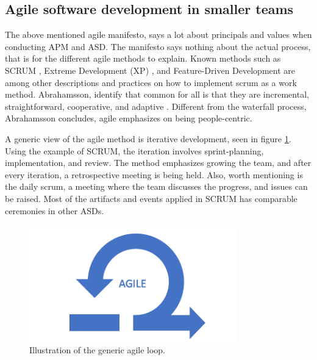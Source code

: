 \subsection{Agile software development in smaller teams}
The above mentioned agile manifesto, says a lot about principals and values when conducting APM and ASD. The manifesto says nothing about the actual process, that is for the different agile methods to explain. Known methods such as SCRUM \cite{sutherland}, Extreme Development (XP) \cite{Beck:1999:EPE:318762}, and Feature-Driven Development\cite{palmer2001practical} are among other descriptions and practices on how to implement scrum as a work method. Abrahamsson, identify that common for all is that they are incremental, straightforward, cooperative, and adaptive \cite{abrahamsson2017agile}. Different from the waterfall process, Abrahamsson concludes, agile emphasizes on being people-centric. 

A generic view of the agile method is iterative development, seen in figure \ref{fig:agile_iteration}. Using the example of SCRUM, the iteration involves sprint-planning, implementation, and review. The method emphasizes growing the team, and after every iteration, a retrospective meeting is being held. Also, worth mentioning is the daily scrum, a meeting where the team discusses the progress, and issues can be raised. Most of the artifacts and events applied in SCRUM has comparable ceremonies in other ASDs. 

\begin{figure}
    \centering
    \includegraphics[width=0.8\textwidth]{fig/agile_loop.png}
    \caption{Illustration of the generic agile loop.}
    \label{fig:agile_iteration}
\end{figure}


